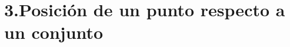 \documentclass[b5paper,10pt,twoside]{book}
\begin{document}





 

    

\section*{3.\enspace Posición de un punto respecto  a un conjunto}
\end{document}

